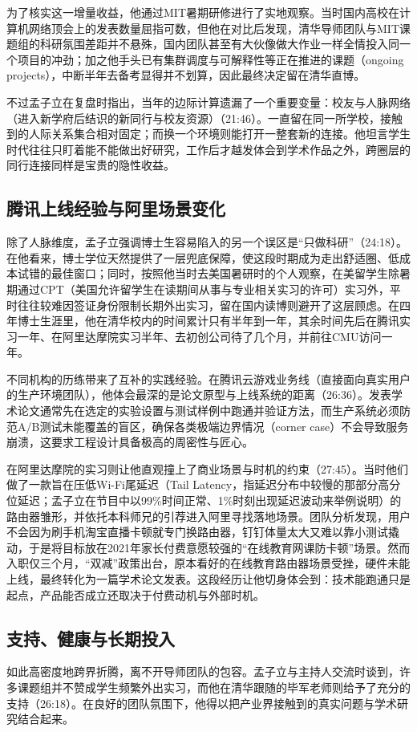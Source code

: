 \documentclass[UTF8,a4paper,11pt,fontset=fandol]{ctexart}
\begin{document}
为了核实这一增量收益，他通过MIT暑期研修进行了实地观察。当时国内高校在计算机网络顶会上的发表数量屈指可数，但他在对比后发现，清华导师团队与MIT课题组的科研氛围差距并不悬殊，国内团队甚至有大伙像做大作业一样全情投入同一个项目的冲劲；加之他手头已有集群调度与可解释性等正在推进的课题（ongoing projects），中断半年去备考显得并不划算，因此最终决定留在清华直博。

不过孟子立在复盘时指出，当年的边际计算遗漏了一个重要变量：校友与人脉网络（进入新学府后结识的新同行与校友资源）（21:46）。一直留在同一所学校，接触到的人际关系集合相对固定；而换一个环境则能打开一整套新的连接。他坦言学生时代往往只盯着能不能做出好研究，工作后才越发体会到学术作品之外，跨圈层的同行连接同样是宝贵的隐性收益。

\subsection{腾讯上线经验与阿里场景变化}
除了人脉维度，孟子立强调博士生容易陷入的另一个误区是“只做科研”（24:18）。在他看来，博士学位天然提供了一层兜底保障，使这段时期成为走出舒适圈、低成本试错的最佳窗口；同时，按照他当时去美国暑研时的个人观察，在美留学生除暑期通过CPT（美国允许留学生在读期间从事与专业相关实习的许可）实习外，平时往往较难因签证身份限制长期外出实习，留在国内读博则避开了这层顾虑。在四年博士生涯里，他在清华校内的时间累计只有半年到一年，其余时间先后在腾讯实习一年、在阿里达摩院实习半年、去初创公司待了几个月，并前往CMU访问一年。

不同机构的历练带来了互补的实践经验。在腾讯云游戏业务线（直接面向真实用户的生产环境团队），他体会最深的是论文原型与上线系统的距离（26:36）。发表学术论文通常先在选定的实验设置与测试样例中跑通并验证方法，而生产系统必须防范A/B测试未能覆盖的盲区，确保各类极端边界情况（corner case）不会导致服务崩溃，这要求工程设计具备极高的周密性与匠心。

在阿里达摩院的实习则让他直观撞上了商业场景与时机的约束（27:45）。当时他们做了一款旨在压低Wi-Fi尾延迟（Tail Latency，指延迟分布中较慢的那部分高分位延迟；孟子立在节目中以99\%时间正常、1\%时刻出现延迟波动来举例说明）的路由器雏形，并依托本科师兄的引荐进入阿里寻找落地场景。团队分析发现，用户不会因为刷手机淘宝直播卡顿就专门换路由器，钉钉体量太大又难以靠小测试撬动，于是将目标放在2021年家长付费意愿较强的“在线教育网课防卡顿”场景。然而入职仅三个月，“双减”政策出台，原本看好的在线教育路由器场景受挫，硬件未能上线，最终转化为一篇学术论文发表。这段经历让他切身体会到：技术能跑通只是起点，产品能否成立还取决于付费动机与外部时机。

\subsection{支持、健康与长期投入}
如此高密度地跨界折腾，离不开导师团队的包容。孟子立与主持人交流时谈到，许多课题组并不赞成学生频繁外出实习，而他在清华跟随的毕军老师则给予了充分的支持（26:18）。在良好的团队氛围下，他得以把产业界接触到的真实问题与学术研究结合起来。
\end{document}
